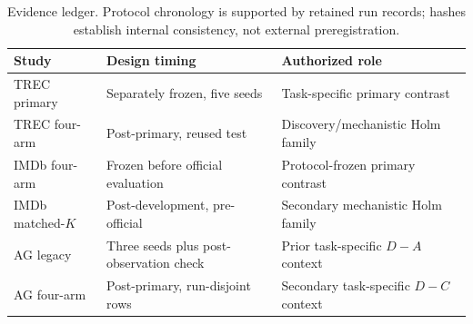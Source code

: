 \begin{table}[h]
\centering
\small
\setlength{\tabcolsep}{2pt}
\begin{tabular}{@{}>{\raggedright\arraybackslash}p{}
                    >{\raggedright\arraybackslash}p{}
                    >{\raggedright\arraybackslash}p{}@{}}
\toprule
Study & Design timing & Authorized role \\
\midrule
TREC primary & Separately frozen, five seeds & Task-specific primary contrast \\
TREC four-arm & Post-primary, reused test & Discovery/mechanistic Holm family \\
IMDb four-arm & Frozen before official evaluation & Protocol-frozen primary contrast \\
IMDb matched-\(K\) & Post-development, pre-official & Secondary mechanistic Holm family \\
AG legacy & Three seeds plus post-observation check & Prior task-specific \(D-A\) context \\
AG four-arm & Post-primary, run-disjoint rows & Secondary task-specific \(D-C\) context \\
\bottomrule
\end{tabular}
\caption{Evidence ledger. Protocol chronology is supported by retained run
records; hashes establish internal consistency, not external preregistration.}
\label{tab:evidence-ledger}
\end{table}
